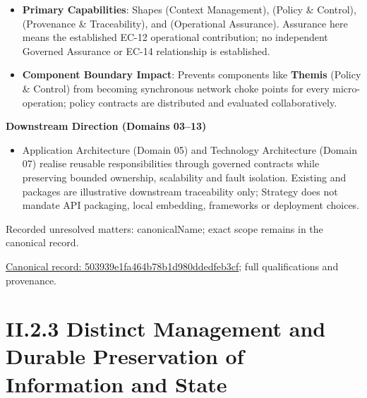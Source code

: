 \begin{itemize}


\item \textbf{Primary Capabilities}: Shapes \texttt{} (Context Management), \texttt{} (Policy \& Control), \texttt{} (Provenance \& Traceability), and \texttt{} (Operational Assurance). Assurance here means the established EC-12 operational contribution; no independent Governed Assurance or EC-14 relationship is established.

\item \textbf{Component Boundary Impact}: Prevents components like \textbf{Themis} (Policy \& Control) from becoming synchronous network choke points for every micro-operation; policy contracts are distributed and evaluated collaboratively.

\end{itemize}


\par\medskip\textbf{Downstream Direction (Domains 03–13)}\par


\begin{itemize}


\item Application Architecture (Domain 05) and Technology Architecture (Domain 07) realise reusable responsibilities through governed contracts while preserving bounded ownership, scalability and fault isolation. Existing \texttt{} and \texttt{} packages are illustrative downstream traceability only; Strategy does not mandate API packaging, local embedding, frameworks or deployment choices.

\end{itemize}

{\small Recorded unresolved matters: canonicalName; exact scope remains in the canonical record.}\par
{\footnotesize \href{../../../../continuum/strategy/course-of-action/503939e1fa464b78b1d980ddedfeb3cf.md}{Canonical record: 503939e1fa464b78b1d980ddedfeb3cf}; full qualifications and provenance.}\par
\section*{II.2.3 Distinct Management and Durable Preservation of Information and State}
\label{navigation:II.2.3}

